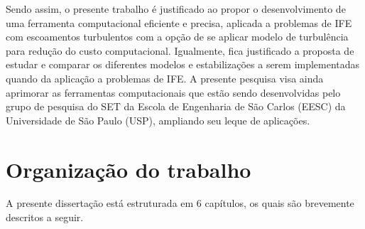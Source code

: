 Sendo assim, o presente trabalho é justificado ao propor o desenvolvimento de uma ferramenta computacional eficiente e precisa, aplicada a problemas de IFE com escoamentos turbulentos com a opção de se aplicar modelo de turbulência para redução do custo computacional. Igualmente, fica justificado a proposta de estudar e comparar os diferentes modelos e estabilizações a serem implementadas quando da aplicação a problemas de IFE. A presente pesquisa visa ainda aprimorar as ferramentas computacionais que estão sendo desenvolvidas pelo grupo de pesquisa do SET da Escola de Engenharia de São Carlos (EESC) da Universidade de São Paulo (USP), ampliando seu leque de aplicações.


\section{Organização do trabalho}

A presente dissertação está estruturada em 6 capítulos, os quais são brevemente descritos a seguir.

